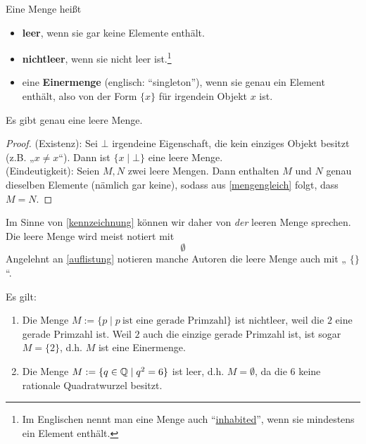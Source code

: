 \begin{defin}  
    Eine Menge heißt
    \begin{itemize}
        \item \textbf{leer}, wenn sie gar keine Elemente enthält.
        \item \textbf{nichtleer}, wenn sie nicht leer ist.\footnote{Im Englischen nennt man eine Menge auch ``\href{https://en.wikipedia.org/wiki/Inhabited_set}{inhabited}'', wenn sie mindestens ein Element enthält.}
        \item eine \textbf{Einermenge} (englisch: ``singleton''), wenn sie genau ein Element enthält, also von der Form $\{x\}$ für irgendein Objekt $x$ ist.
    \end{itemize}
\end{defin}


\begin{satz} \label{leeremengeeind}
    Es gibt genau eine leere Menge.
\end{satz}
\begin{proof}
    (Existenz): Sei $\bot$ irgendeine Eigenschaft, die kein einziges Objekt besitzt (z.B. „$x\neq x$“). Dann ist $\{ x\mid \bot \}$ eine leere Menge. \\[0.5em]
    (Eindeutigkeit): Seien $M,N$ zwei leere Mengen. Dann enthalten $M$ und $N$ genau dieselben Elemente (nämlich gar keine), sodass aus \cref{mengengleich} folgt, dass $M=N$.
\end{proof}


\begin{nota}
    Im Sinne von \cref{kennzeichnung} können wir daher von \emph{der} leeren Menge sprechen. Die leere Menge wird meist notiert mit
        \[ \emptyset \]
    Angelehnt an \cref{auflistung} notieren manche Autoren die leere Menge auch mit „ $\{\}$ “.
\end{nota}


\begin{bsp}
    Es gilt:
    \begin{enumerate}
        \item Die Menge $M:=\{p\mid p\ \text{ist eine gerade Primzahl}\}$ ist nichtleer, weil die $2$ eine gerade Primzahl ist. Weil $2$ auch die einzige gerade Primzahl ist, ist sogar $M=\{2\}$, d.h. $M$ ist eine Einermenge.
        \item Die Menge $M:= \{ q\in \mathbb Q\mid q^2=6\}$ ist leer, d.h. $M=\emptyset$, da die $6$ keine rationale Quadratwurzel besitzt.
    \end{enumerate}
\end{bsp}


